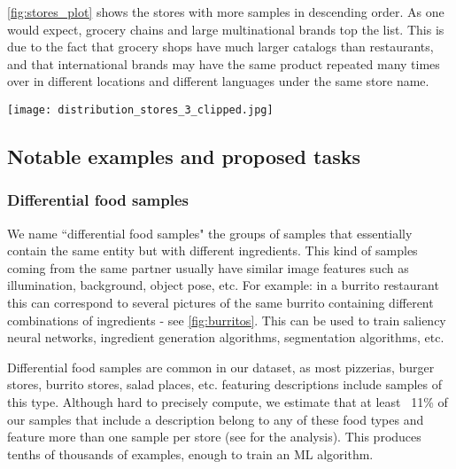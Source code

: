 \documentclass[10pt,twocolumn,letterpaper]{article}
\begin{document}
\cref{fig:stores_plot} shows the stores with more samples in descending order. As one would expect, grocery chains and large multinational brands top the list. This is due to the fact that grocery shops have much larger catalogs than restaurants, and that international brands may have the same product repeated many times over in different locations and different languages under the same store name.

\begin{figure*}[ht]
  \centering
    \texttt{[image: distribution\_stores\_3\_clipped.jpg]}
  \caption{Store names with a larger number of samples, excluding auxiliary stores. Only shown the top 40 store names - representing around 9\% of the samples. Note how the dataset is well balanced between stores with a lot of samples and stores featuring a much more modest collection  \label{fig:stores_plot}.}
\end{figure*}
\subsection{Notable examples and proposed tasks}
\subsubsection{Differential food samples}
We name ``differential food samples" the groups of samples that essentially contain the same entity but with different ingredients. This kind of samples coming from the same partner usually have similar image features such as illumination, background, object pose, etc. For example: in a burrito restaurant this can correspond to several pictures of the same burrito containing different combinations of ingredients - see \cref{fig:burritos}. This can be used to train saliency neural networks, ingredient generation algorithms, segmentation algorithms, etc.

Differential food samples are common in our dataset, as most pizzerias, burger stores, burrito stores,  salad places, etc. featuring descriptions include samples of this type. Although hard to precisely compute, we estimate that at least ~11\% of our samples that include a description belong to any of these food types and feature more than one sample per store (see \cite{app_2021} for the analysis). This produces tenths of thousands of examples, enough to train an ML algorithm.
\end{document}
